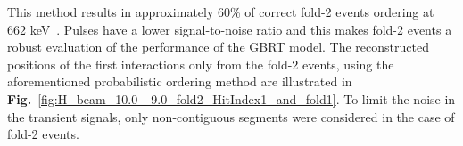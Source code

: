     
This method results in approximately 60\% of correct fold-2 events ordering at 662 keV~\cite{Piqueras2004ADetectors}.
Pulses have a lower signal-to-noise ratio and this makes fold-2 events a robust evaluation of the performance of the GBRT model. %
The reconstructed positions of the first interactions only from the fold-2 events, using the aforementioned probabilistic ordering method are illustrated in \textbf{Fig.}~\ref{fig:H_beam_10.0_-9.0_fold2_HitIndex1_and_fold1}. To limit the noise in the transient signals, only non-contiguous segments were considered in the case of fold-2 events.



